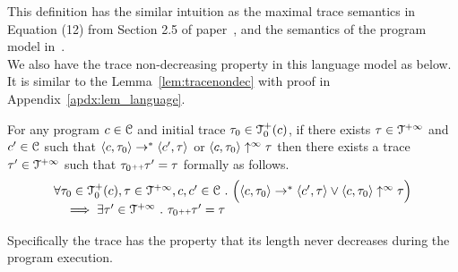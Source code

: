 %
This definition has the similar intuition as the maximal trace semantics in Equation (12) from Section 2.5 of paper~\cite{Cousot19a}, and the semantics of the program model in~\cite{SinnZV17}.
\\
We also have the trace non-decreasing property in this language model as below.
It is similar to the Lemma~\ref{lem:tracenondec} with proof in Appendix~\ref{apdx:lem_language}. 
\begin{lem}
  \label{lem:psRB-tracenondec}
  For any program $c \in \mathcal{C}$ and initial trace $\mathtt{\tau}_0 \in \mathcal{T}^{+}_0(c)$,
  if there exists $\mathtt{\tau} \in \mathcal{T}^{+\infty}$ and $c' \in \mathcal{C} $ such that $\langle c, \mathtt{\tau}_0 \rangle \rightarrow^{*} \langle c', \mathtt{\tau} \rangle $ or 
  $\langle c, \mathtt{\tau}_0 \rangle \uparrow^{\infty} \mathtt{\tau}$  
  then there exists a trace $\mathtt{\tau}' \in \mathcal{T}^{+\infty}$ such that $\mathtt{\tau}_0 {\scriptscriptstyle ++} \mathtt{\tau}' = \mathtt{\tau}$ formally as follows.
  \[
    \begin{array}{l}
    \forall \mathtt{\tau}_0 \in \mathcal{T}^{+}_0(c), \mathtt{\tau} \in \mathcal{T}^{+\infty}, c, c' \in \mathcal{C} ~.~
    \Big( \langle c, \mathtt{\tau}_0 \rangle \rightarrow^{*} \langle c', \mathtt{\tau} \rangle 
    \lor  \langle c, \mathtt{\tau}_0 \rangle \uparrow^{\infty} \mathtt{\tau} \Big)
    \\ \quad
    \implies \exists \mathtt{\tau}' \in \mathcal{T}^{+\infty} ~.~ \mathtt{\tau}_0 {\scriptscriptstyle ++} \mathtt{\tau}' = \mathtt{\tau} 
    \end{array}
    \]
  \end{lem}
  Specifically the trace has the property that its length never decreases during the program execution.
